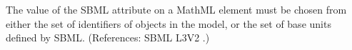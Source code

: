 The value of the SBML attribute  on a MathML 
element must be chosen from either the set of identifiers of
\UnitDefinition objects in the model, or the set of base units defined by
SBML.  (References: SBML L3V2 .)
